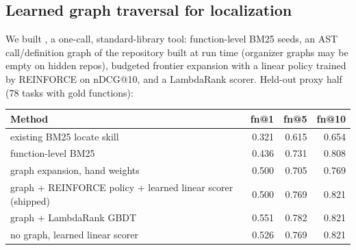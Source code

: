 \subsection{Learned graph traversal for localization}
We built , a one-call, standard-library tool: function-level BM25 seeds, an AST call/definition graph of the
repository built at run time (organizer graphs may be empty on hidden repos), budgeted frontier expansion with a linear policy
trained by REINFORCE on nDCG@10, and a LambdaRank scorer. Held-out proxy half (78 tasks with gold functions):
\begin{table}[H]\centering\small
\begin{tabular}{lrrr}\toprule
Method & fn@1 & fn@5 & fn@10 \\\midrule
existing BM25 locate skill & 0.321 & 0.615 & 0.654 \\
function-level BM25 & 0.436 & 0.731 & 0.808 \\
graph expansion, hand weights & 0.500 & 0.705 & 0.769 \\
graph + REINFORCE policy + learned linear scorer (shipped) & 0.500 & 0.769 & 0.821 \\
graph + LambdaRank GBDT & 0.551 & 0.782 & 0.821 \\
no graph, learned linear scorer & 0.526 & 0.769 & 0.821 \\\bottomrule
\end{tabular}\end{table}

